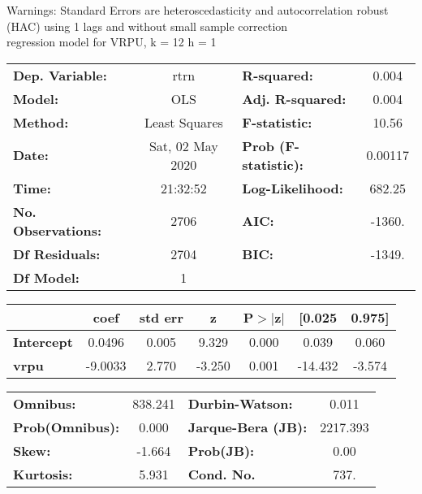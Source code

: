 Warnings: \newline
 [1] Standard Errors are heteroscedasticity and autocorrelation robust (HAC) using 1 lags and without small sample correction\\ 

regression model for VRPU, k = 12 h = 1\begin{center}
\begin{tabular}{lclc}
\toprule
\textbf{Dep. Variable:}    &       rtrn       & \textbf{  R-squared:         } &     0.004   \\
\textbf{Model:}            &       OLS        & \textbf{  Adj. R-squared:    } &     0.004   \\
\textbf{Method:}           &  Least Squares   & \textbf{  F-statistic:       } &     10.56   \\
\textbf{Date:}             & Sat, 02 May 2020 & \textbf{  Prob (F-statistic):} &  0.00117    \\
\textbf{Time:}             &     21:32:52     & \textbf{  Log-Likelihood:    } &    682.25   \\
\textbf{No. Observations:} &        2706      & \textbf{  AIC:               } &    -1360.   \\
\textbf{Df Residuals:}     &        2704      & \textbf{  BIC:               } &    -1349.   \\
\textbf{Df Model:}         &           1      & \textbf{                     } &             \\
\bottomrule
\end{tabular}
\begin{tabular}{lcccccc}
                   & \textbf{coef} & \textbf{std err} & \textbf{z} & \textbf{P$> |$z$|$} & \textbf{[0.025} & \textbf{0.975]}  \\
\midrule
\textbf{Intercept} &       0.0496  &        0.005     &     9.329  &         0.000        &        0.039    &        0.060     \\
\textbf{vrpu}      &      -9.0033  &        2.770     &    -3.250  &         0.001        &      -14.432    &       -3.574     \\
\bottomrule
\end{tabular}
\begin{tabular}{lclc}
\textbf{Omnibus:}       & 838.241 & \textbf{  Durbin-Watson:     } &    0.011  \\
\textbf{Prob(Omnibus):} &   0.000 & \textbf{  Jarque-Bera (JB):  } & 2217.393  \\
\textbf{Skew:}          &  -1.664 & \textbf{  Prob(JB):          } &     0.00  \\
\textbf{Kurtosis:}      &   5.931 & \textbf{  Cond. No.          } &     737.  \\
\bottomrule
\end{tabular}
\end{center}


